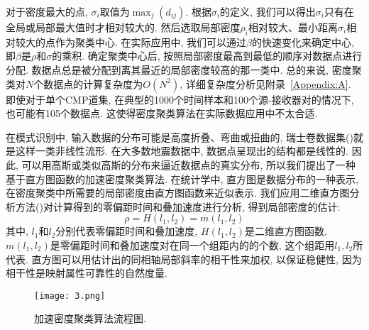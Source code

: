 对于密度最大的点, $\sigma_i$取值为$\max_j(d_{ij})$. 根据$\sigma_i$的定义, 我们可以得出$\sigma_i$只有在全局或局部最大值时才相对较大的. 然后选取局部密度$\rho_i$相对较大、最小距离$\sigma_i$相对较大的点作为聚类中心. 在实际应用中, 我们可以通过$\beta$的快速变化来确定中心, 即$\beta$是$\rho$和$\sigma$的乘积. 确定聚类中心后, 按照局部密度最高到最低的顺序对数据点进行分配. 数据点总是被分配到离其最近的局部密度较高的那一类中. 总的来说, 密度聚类对$N$个数据点的计算复杂度为$O(N^2)$, 详细复杂度分析见附录~\ref{Appendix:A}. 即使对于单个CMP道集, 在典型的1000个时间样本和100个源-接收器对的情况下, 也可能有105个数据点. 这使得密度聚类算法在实际数据应用中不太合适. 

在模式识别中, 输入数据的分布可能是高度折叠、弯曲或扭曲的, 瑞士卷数据集(\cite{Tenenbaum2000})就是这样一类非线性流形. 在大多数地震数据中, 数据点呈现出的结构都是线性的. 因此, 可以用高斯或类似高斯的分布来逼近数据点的真实分布, 所以我们提出了一种基于直方图函数的加速密度聚类算法. 在统计学中, 直方图是数据分布的一种表示, 在密度聚类中所需要的局部密度由直方图函数来近似表示. 我们应用二维直方图分析方法(\cite{Gonzalez2002,Zhang2015})对计算得到的零偏距时间和叠加速度进行分析, 得到局部密度的估计: 
\begin{equation}
    \rho=H(l_1,l_2)=m(l_1,l_2)
\end{equation}
其中, $l_1$和$l_2$分别代表零偏距时间和叠加速度, $H(l_1,l_2)$是二维直方图函数, $m(l_1,l_2)$是零偏距时间和叠加速度对在同一个组距内的的个数, 这个组距用$l_1,l_2$所代表. 直方图可以用估计出的同相轴局部斜率的相干性来加权, 以保证稳健性, 因为相干性是映射属性可靠性的自然度量. 
\begin{figure}[htb]
    \centering
    \texttt{[image: 3.png]}
    \caption{加速密度聚类算法流程图. \label{fig:3}}
\end{figure}

